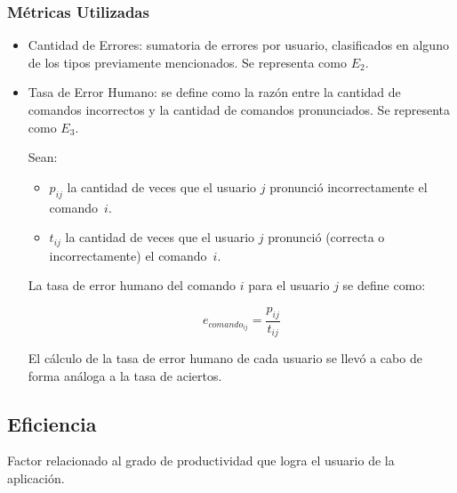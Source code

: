 \subsubsection{M\'etricas Utilizadas}
\begin{itemize}
	\item Cantidad de Errores: sumatoria de errores por usuario, clasificados en
	alguno de los tipos previamente mencionados. Se representa como $E_2$.
	\item Tasa de Error Humano: se define como la raz\'on entre la cantidad de comandos incorrectos
	y la cantidad de comandos pronunciados. Se representa como $E_3$.
	
	Sean:

	\begin{itemize}
		\item $p_{ij}$ la cantidad de veces que el usuario $j$ pronunci\'o incorrectamente el \mbox{comando $i$.}
		\item $t_{ij}$ la cantidad de veces que el usuario $j$ pronunci\'o (correcta o incorrectamente) el 
		\mbox{comando $i$.}
	\end{itemize}
	La tasa de error humano del comando $i$ para el usuario $j$ se define como: 

	\begin{equation*}
		e_{{comando}_{ij}}=\frac{p_{ij}}{t_{ij}}
	\end{equation*}

	El c\'alculo de la tasa de error humano de cada usuario se llev\'o a cabo de forma an\'aloga 
	a la tasa de aciertos.
\end{itemize}

\subsection{Eficiencia}
Factor relacionado al grado de productividad que logra el usuario de la aplicaci\'on.
